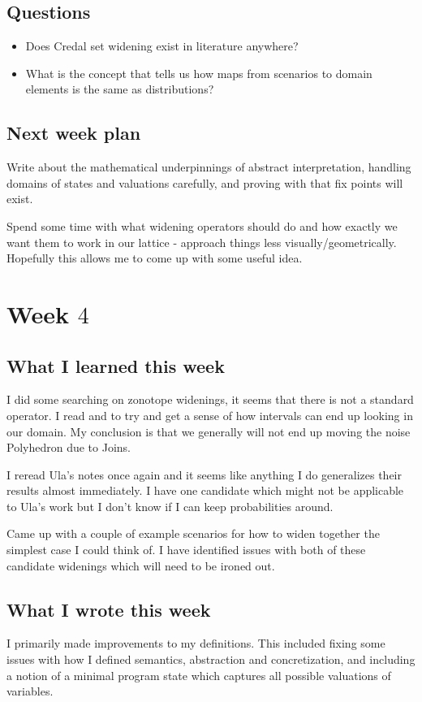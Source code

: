 \documentclass{amsart}
\begin{document}
\subsection{Questions}
\begin{itemize}
  \item Does Credal set widening exist in literature anywhere?
  \item What is the concept that tells us how maps from scenarios to domain elements is the same as distributions?
\end{itemize}

\subsection{Next week plan}
Write about the mathematical underpinnings of abstract interpretation, handling domains of states and valuations carefully, and proving with \cite{Tarski} that fix points will exist.

Spend some time with what widening operators should do and how exactly we want them to work in our lattice - approach things less visually/geometrically.
Hopefully this allows me to come up with some useful idea.



\section{Week $4$}

\subsection{What I learned this week}
I did some searching on zonotope widenings, it seems that there is not a standard operator.
I read \cite{LogicalZonotopeJoin} and \cite{AccurateZonotopeJoin} to try and get a sense of how intervals can end up looking in our domain.
My conclusion is that we generally will not end up moving the noise Polyhedron due to Joins.

I reread Ula's notes once again and it seems like anything I do generalizes their results almost immediately. I have one candidate which might not be applicable to Ula's work but I don't know if I can keep probabilities around.

Came up with a couple of example scenarios for how to widen together the simplest case I could think of.
I have identified issues with both of these candidate widenings which will need to be ironed out.


\subsection{What I wrote this week}
I primarily made improvements to my definitions.
This included fixing some issues with how I defined semantics, abstraction and concretization, and including a notion of a minimal program state which captures all possible valuations of variables.
\end{document}

